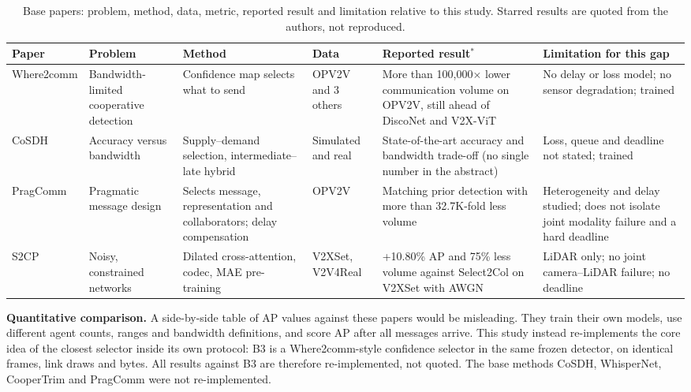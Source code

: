 \documentclass[conference]{IEEEtran}
\begin{document}
\begin{table}[t]
\caption{Base papers: problem, method, data, metric, reported result and limitation relative to this study. Starred results are quoted from the authors, not reproduced.}\label{tab:base}
\centering\scriptsize\setlength{\tabcolsep}{3pt}
\begin{tabular}{>{\raggedright\arraybackslash}p{1.9cm}>{\raggedright\arraybackslash}p{3.0cm}>{\raggedright\arraybackslash}p{3.1cm}>{\raggedright\arraybackslash}p{1.9cm}>{\raggedright\arraybackslash}p{3.0cm}>{\raggedright\arraybackslash}p{3.7cm}}
\toprule
Paper & Problem & Method & Data & Reported result$^*$ & Limitation for this gap\\\midrule
Where2comm \cite{hu2022where2comm} & Bandwidth-limited cooperative detection & Confidence map selects what to send & OPV2V and 3 others & More than 100,000$\times$ lower communication volume on OPV2V, still ahead of DiscoNet and V2X-ViT & No delay or loss model; no sensor degradation; trained\\
CoSDH \cite{xu2025cosdh} & Accuracy versus bandwidth & Supply--demand selection, intermediate--late hybrid & Simulated and real & State-of-the-art accuracy and bandwidth trade-off (no single number in the abstract) & Loss, queue and deadline not stated; trained\\
PragComm \cite{hu2026prag} & Pragmatic message design & Selects message, representation and collaborators; delay compensation & OPV2V & Matching prior detection with more than 32.7K-fold less volume & Heterogeneity and delay studied; does not isolate joint modality failure and a hard deadline\\
S2CP \cite{liu2025} & Noisy, constrained networks & Dilated cross-attention, codec, MAE pre-training & V2XSet, V2V4Real & +10.80\% AP and 75\% less volume against Select2Col on V2XSet with AWGN & LiDAR only; no joint camera--LiDAR failure; no deadline\\
\bottomrule
\end{tabular}
\end{table}

\textbf{Quantitative comparison.} A side-by-side table of AP values against these papers would be misleading. They train their own models, use different agent counts, ranges and bandwidth definitions, and score AP after all messages arrive. This study instead re-implements the core idea of the closest selector inside its own protocol: B3 is a Where2comm-style confidence selector in the same frozen detector, on identical frames, link draws and bytes. All results against B3 are therefore re-implemented, not quoted. The base methods CoSDH, WhisperNet, CooperTrim and PragComm were not re-implemented.
\end{document}
